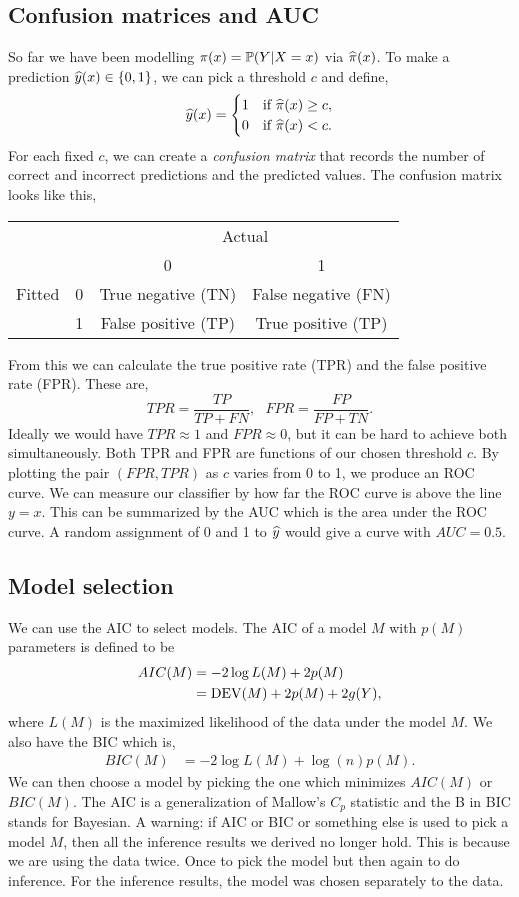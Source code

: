 \subsection{Confusion  matrices  and  AUC}
So  far we have been modelling $\pi(x) = {\mathbb{P}}(Y|X=x)$  via $\widehat{\pi}(x)$. To make a prediction $\widehat{y}(x)  \in \{0,1\}$, we  can pick a  threshold  $c$ and  define,
\[\widehat{y}(x) = \begin{cases}
    1 &\text{if } \widehat{\pi}(x) \ge c,\\
    0 & \text{if }  \widehat{\pi}(x) < c.
\end{cases}  \]
For each  fixed   $c$, we  can  create  a  \emph{confusion  matrix} that  records the number  of  correct  and incorrect predictions  and  the predicted values. The  confusion matrix looks  like this,
\begin{center}
    \begin{tabular}{cc|cc}
        &&\multicolumn{2}{c}{Actual}\\
        &&0&1\\
        \hline 
        Fitted&0&True   negative (TN)&False negative  (FN)\\
                &1&  False positive (TP)& True  positive (TP)
    \end{tabular}
\end{center}
From this we  can calculate the  true positive  rate (TPR)  and the false positive rate (FPR). These are,
\[TPR  = \frac{TP}{TP+FN},~~~FPR  = \frac{FP}{FP+TN}.\]
Ideally  we  would  have $TPR  \approx  1$  and $FPR  \approx  0$, but it can be hard to  achieve both simultaneously. Both TPR and FPR  are functions  of our chosen threshold  $c$. By plotting  the pair  $(FPR,TPR)$ as $c$  varies  from  0 to  1, we produce an ROC curve. We can  measure  our  classifier by how far the ROC curve is above  the line $y=x$. This can be summarized by the  AUC which is the area under the ROC curve. A random assignment of 0  and  1 to $\widehat{y}$ would give a curve with $AUC = 0.5$.

\subsection{Model selection}
We can use the AIC to select models. The AIC of a model $M$ with $p(M)$ parameters is defined to be
\begin{align*}
    AIC(M) &=-2\log L(M)+2p(M)\\
&=\operatorname{DEV}(M)+2p(M)+2g(Y),
\end{align*}
where $L(M)$ is the maximized likelihood of the data under the model $M$. We also have the BIC which is,
\begin{align*}
    BIC(M) &=-2\log L(M)+\log(n)p(M).
\end{align*}
We can then choose a model by picking the one which minimizes $AIC(M)$ or $BIC(M)$. The AIC is a generalization of Mallow's $C_p$ statistic and the B in BIC stands for Bayesian. A warning: if AIC or BIC or something else is used to pick a model $M$, then all the inference results we derived no longer hold. This is because we are using the data  twice. Once to pick the model but then again to do inference. For the inference results, the model was chosen separately to the data. 
